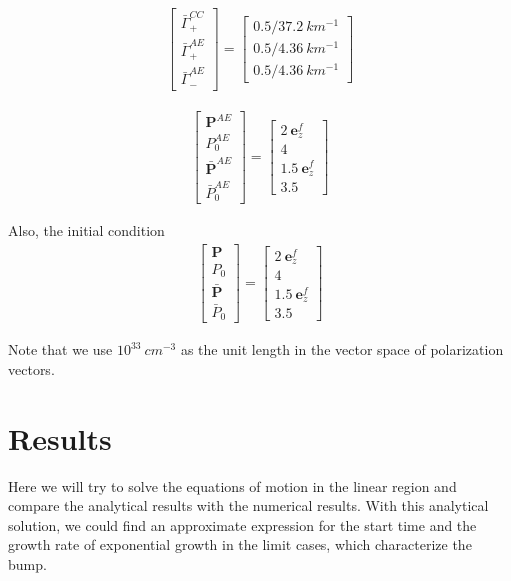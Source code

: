 \documentclass[aps,prd,twocolumn,amsmath,amssymb,groupedaddress]{revtex4-2}
\begin{document}
\begin{eqnarray}
	\label{equ:par_bgamma}
	\begin{bmatrix}
		\bar{\Gamma}^{CC}_+ \\ \bar{\Gamma}^{AE}_+ \\ \bar{\Gamma}^{AE}_-
	\end{bmatrix}
	= \begin{bmatrix}
		0.5/37.2 ~km^{-1} \\ 0.5/4.36 ~km^{-1} \\ 0.5/4.36 ~km^{-1} 
	\end{bmatrix}
\end{eqnarray}

\begin{eqnarray}
	\label{equ:par_P}
	\begin{bmatrix}
		\textbf{P}^{AE} \\ P^{AE}_0 \\ \bar{\textbf{P}}^{AE} \\ \bar{P}^{AE}_0
	\end{bmatrix}
	= \begin{bmatrix}
		2 ~\textbf{e}_z^f\\ 4 \\ 1.5 ~\textbf{e}_z^f \\ 3.5
	\end{bmatrix}
\end{eqnarray}

Also, the initial condition
\begin{eqnarray}
	\label{equ:ini_condition}
	\begin{bmatrix}
		\textbf{P} \\ P_0 \\ \bar{\textbf{P}} \\ \bar{P}_0
	\end{bmatrix}
	= \begin{bmatrix}
		2 ~\textbf{e}_z^f\\ 4 \\ 1.5 ~\textbf{e}_z^f \\ 3.5
	\end{bmatrix}
\end{eqnarray}

Note that we use $10^{33} ~cm^{-3}$ as the unit length in the vector space of polarization vectors.

\section{\label{sec:results} Results}
Here we will try to solve the equations of motion in the linear region and compare the analytical results with the numerical results. With this analytical solution, we could find an approximate expression for the start time and the growth rate of exponential growth in the limit cases, which characterize the bump.
\end{document}
